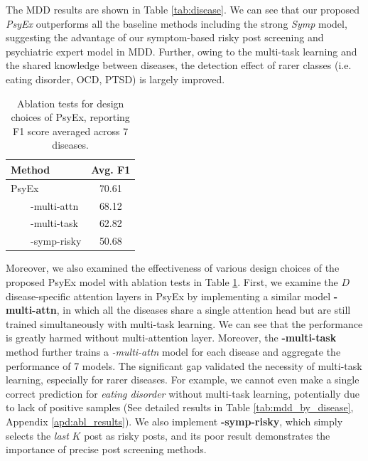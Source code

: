The MDD results are shown in Table \ref{tab:disease}. We can see that our proposed \textit{PsyEx} outperforms all the  baseline methods including the strong \textit{Symp} model, suggesting the advantage of our symptom-based risky post screening and psychiatric expert model in MDD. Further, owing to the multi-task learning and the shared knowledge between diseases, the detection effect of rarer classes (i.e. eating disorder, OCD, PTSD) is largely improved.

\begin{table}[h]
    \centering
    \begin{tabular}{l|c}
        \hline
        Method & Avg. F1             \\
        \hline
        PsyEx &  70.61      \\
        ~~~~-multi-attn & 68.12       \\
        ~~~~-multi-task & 62.82     \\
        ~~~~-symp-risky & 50.68     \\
        \hline
    \end{tabular}
    \caption{Ablation tests for design choices of PsyEx, reporting F1 score averaged across 7 diseases. }
    \label{tab:ablation}
\end{table}

Moreover, we also examined the effectiveness of various design choices of the proposed PsyEx model with ablation tests in Table \ref{tab:ablation}.
First, we examine the $D$ disease-specific attention layers in PsyEx by implementing a similar model \textbf{-multi-attn}, in which all the diseases share a single attention head but are still trained simultaneously with multi-task learning. We can see that the performance is greatly harmed without multi-attention layer. 
Moreover, the \textbf{-multi-task} method further trains a \textit{-multi-attn} model for each disease and aggregate the performance of 7 models. The significant gap validated the necessity of multi-task learning, especially for rarer diseases. For example, we cannot even make a single correct prediction for \textit{eating disorder} without multi-task learning, potentially due to lack of positive samples (See detailed results in Table \ref{tab:mdd_by_disease}, Appendix \ref{apd:abl_results}). 
We also implement \textbf{-symp-risky}, which simply selects the \textit{last} $K$ post as risky posts, and its poor result demonstrates the importance of precise post screening methods.


